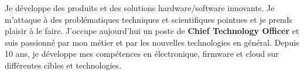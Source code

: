 \par{
 Je développe des produits et des solutions hardware/software innovants. Je m'attaque à des problématiques techniques et scientifiques pointues et je prends plaisir à le faire. J'occupe aujourd'hui un poste de \textbf{Chief Technology Officer} et suis passionné par mon métier et par les nouvelles technologies en général. Depuis 10 ans, je développe mes compétences en électronique, firmware et cloud sur différentes cibles et technologies.
}